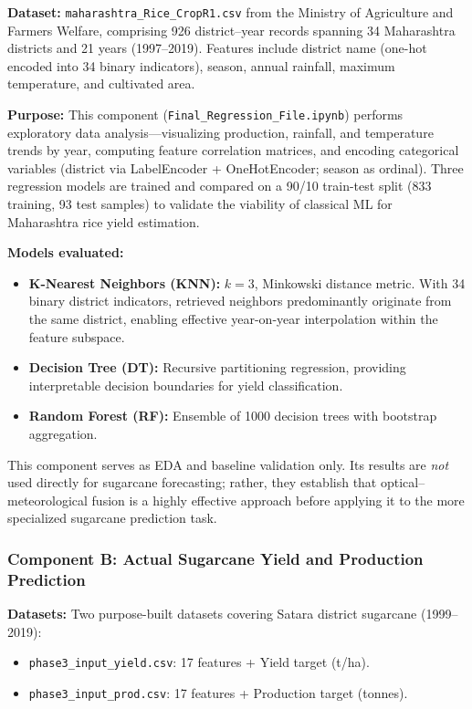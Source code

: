 \documentclass[conference]{IEEEtran}
\begin{document}
\textbf{Dataset:} \texttt{maharashtra\_Rice\_CropR1.csv} from the Ministry of
Agriculture and Farmers Welfare, comprising 926 district--year records spanning
34 Maharashtra districts and 21 years (1997--2019). Features include district
name (one-hot encoded into 34 binary indicators), season, annual rainfall,
maximum temperature, and cultivated area.

\textbf{Purpose:} This component (\texttt{Final\_Regression\_File.ipynb})
performs exploratory data analysis---visualizing production, rainfall, and
temperature trends by year, computing feature correlation matrices, and encoding
categorical variables (district via LabelEncoder + OneHotEncoder; season as
ordinal). Three regression models are trained and compared on a 90/10 train-test
split (833 training, 93 test samples) to validate the viability of classical
ML for Maharashtra rice yield estimation.

\textbf{Models evaluated:}
\begin{itemize}[leftmargin=*]
  \item \textbf{K-Nearest Neighbors (KNN):} $k = 3$, Minkowski distance metric.
    With 34 binary district indicators, retrieved neighbors predominantly
    originate from the same district, enabling effective year-on-year
    interpolation within the feature subspace.
  \item \textbf{Decision Tree (DT):} Recursive partitioning regression,
    providing interpretable decision boundaries for yield classification.
  \item \textbf{Random Forest (RF):} Ensemble of 1000 decision trees with
    bootstrap aggregation.
\end{itemize}

This component serves as EDA and baseline validation only. Its results are
\emph{not} used directly for sugarcane forecasting; rather, they establish
that optical--meteorological fusion is a highly effective approach before
applying it to the more specialized sugarcane prediction task.

\subsubsection{Component B: Actual Sugarcane Yield and Production Prediction}

\textbf{Datasets:} Two purpose-built datasets covering Satara district
sugarcane (1999--2019):
\begin{itemize}[leftmargin=*]
  \item \texttt{phase3\_input\_yield.csv}: 17 features + Yield target (t/ha).
  \item \texttt{phase3\_input\_prod.csv}: 17 features + Production target (tonnes).
\end{itemize}
\end{document}
